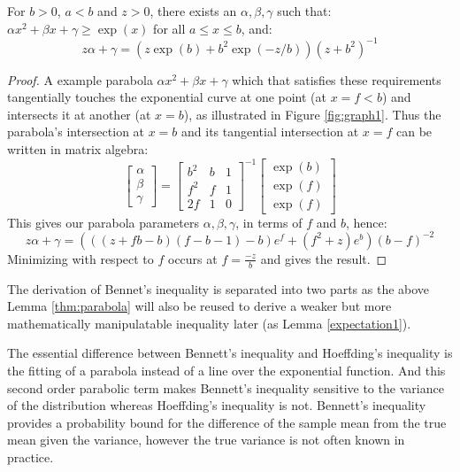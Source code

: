 \begin{lemma}\label{thm:parabola}
For $b>0$, $a<b$ and $z>0$, there exists an $\alpha,\beta,\gamma$ such that: $\alpha x^2+\beta x+\gamma\ge \exp(x)$ for all $a\le x\le b$, and:
$$z\alpha+\gamma = (z\exp(b) + b^2\exp(-z/b))(z + b^2)^{-1}$$
\end{lemma}
\begin{proof}
A example parabola $\alpha x^2+\beta x+\gamma$ which that satisfies these requirements tangentially touches the exponential curve at one point (at $x=f<b$) and intersects it at another (at $x=b$), as illustrated in Figure \ref{fig:graph1}.
Thus the parabola's intersection at $x=b$ and its tangential intersection at $x=f$ can be written in matrix algebra:
$$
\begin{bmatrix}
    \alpha \\
    \beta \\
	\gamma
\end{bmatrix}
=
\begin{bmatrix}
    b^2 & b & 1 \\
    f^2 & f & 1 \\
	2f  & 1 & 0
\end{bmatrix}^{-1}
\begin{bmatrix}
    \exp(b) \\
    \exp(f) \\
	\exp(f)
\end{bmatrix}$$
This gives our parabola parameters $\alpha,\beta,\gamma$, in terms of $f$ and $b$, hence:
$$z\alpha+\gamma = (((z+fb-b)(f-b-1)-b)e^f+(f^2+z)e^b)(b-f)^{-2}$$
Minimizing with respect to $f$ occurs at $f=\frac{-z}{b}$ and gives the result.
\end{proof}




The derivation of Bennet's inequality is separated into two parts as the above Lemma \ref{thm:parabola} will also be reused to derive a weaker but more mathematically manipulatable inequality later (as Lemma \ref{expectation1}).

The essential difference between Bennett's inequality and Hoeffding's inequality is the fitting of a parabola instead of a line over the exponential function.
And this second order parabolic term makes Bennett's inequality sensitive to the variance of the distribution whereas Hoeffding's inequality is not.
Bennett's inequality provides a probability bound for the difference of the sample mean from the true mean given the variance, however the true variance is not often known in practice.


